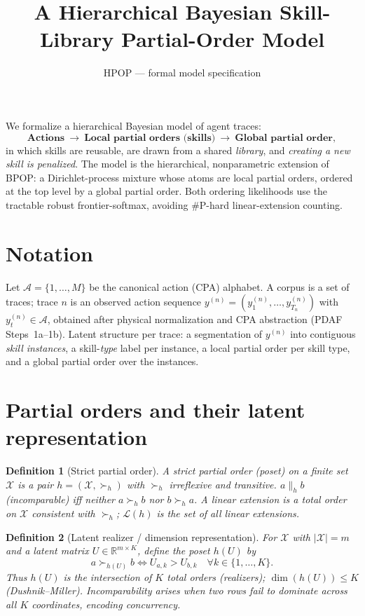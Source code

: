\documentclass[11pt]{article}
\title{A Hierarchical Bayesian Skill-Library Partial-Order Model}
\author{HPOP --- formal model specification}
\date{}
\newtheorem{definition}{Definition}
\newcommand{\R}{\mathbb{R}}
\newcommand{\sA}{\mathcal{A}}
\newcommand{\sX}{\mathcal{X}}
\newcommand{\sL}{\mathcal{L}}
\begin{document}
\maketitle

\noindent
We formalize a hierarchical Bayesian model of agent traces:
\[
\textbf{Actions}\ \longrightarrow\ \textbf{Local partial orders (skills)}\ \longrightarrow\ \textbf{Global partial order},
\]
in which skills are reusable, are drawn from a shared \emph{library}, and \emph{creating a new skill is
penalized}. The model is the hierarchical, nonparametric extension of BPOP: a Dirichlet-process mixture
whose atoms are local partial orders, ordered at the top level by a global partial order. Both ordering
likelihoods use the tractable robust frontier-softmax, avoiding \#P-hard linear-extension counting.

\section{Notation}
Let $\sA=\{1,\dots,M\}$ be the canonical action (CPA) alphabet. A corpus is a set of traces; trace $n$
is an observed action sequence $y^{(n)}=(y^{(n)}_1,\dots,y^{(n)}_{T_n})$ with $y^{(n)}_t\in\sA$, obtained
after physical normalization and CPA abstraction (PDAF Steps~1a--1b). Latent structure per trace: a
segmentation of $y^{(n)}$ into contiguous \emph{skill instances}, a skill-\emph{type} label per instance,
a local partial order per skill type, and a global partial order over the instances.

\section{Partial orders and their latent representation}
\begin{definition}[Strict partial order]
A strict partial order (poset) on a finite set $\sX$ is a pair $h=(\sX,\succ_h)$ with $\succ_h$
irreflexive and transitive. $a\parallel_h b$ (\emph{incomparable}) iff neither $a\succ_h b$ nor $b\succ_h a$.
A \emph{linear extension} is a total order on $\sX$ consistent with $\succ_h$; $\sL(h)$ is the set of all
linear extensions.
\end{definition}

\begin{definition}[Latent realizer / dimension representation]
\label{def:U}
For $\sX$ with $|\sX|=m$ and a latent matrix $U\in\R^{m\times K}$, define the poset $h(U)$ by
\begin{equation}
a\succ_{h(U)} b \iff U_{a,k} > U_{b,k}\quad\forall k\in\{1,\dots,K\}.
\label{eq:dominance}
\end{equation}
Thus $h(U)$ is the intersection of $K$ total orders (\emph{realizers}); $\dim(h(U))\le K$
(Dushnik--Miller). Incomparability arises when two rows fail to dominate across all $K$ coordinates,
encoding concurrency.
\end{definition}
\end{document}
